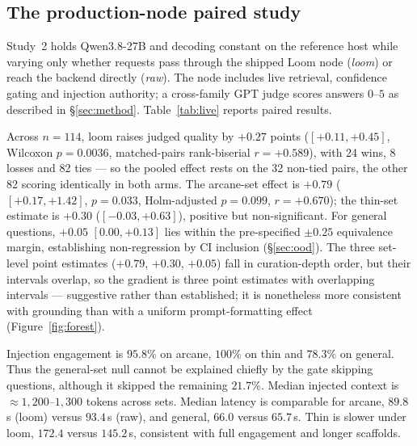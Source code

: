\documentclass[10pt,twocolumn]{article}
\begin{document}
\subsection{The production-node paired study}\label{sec:live}
Study~2 holds Qwen3.8-27B and decoding constant on the reference host while varying only whether requests pass through the shipped Loom node (\emph{loom}) or reach the backend directly (\emph{raw}). The node includes live retrieval, confidence gating and injection authority; a cross-family GPT judge scores answers $0$--$5$ as described in \S\ref{sec:method}. Table~\ref{tab:live} reports paired results.

Across $n=114$, loom raises judged quality by $\mathbf{+0.27}$ points ($[+0.11,+0.45]$, Wilcoxon $p=0.0036$, matched-pairs rank-biserial $r=+0.589$), with 24 wins, 8 losses and 82 ties --- so the pooled effect rests on the 32 non-tied pairs, the other 82 scoring identically in both arms. The arcane-set effect is $\mathbf{+0.79}$ ($[+0.17,+1.42]$, $p=0.033$, Holm-adjusted $p=0.099$, $r=+0.670$); the thin-set estimate is $+0.30$ ($[-0.03,+0.63]$), positive but non-significant. For general questions, $+0.05$ $[0.00,+0.13]$ lies within the pre-specified $\pm0.25$ equivalence margin, establishing non-regression by CI inclusion (\S\ref{sec:ood}). The three set-level point estimates ($+0.79$, $+0.30$, $+0.05$) fall in curation-depth order, but their intervals overlap, so the gradient is three point estimates with overlapping intervals --- suggestive rather than established; it is nonetheless more consistent with grounding than with a uniform prompt-formatting effect (Figure~\ref{fig:forest}).



Injection engagement is $95.8\%$ on arcane, $100\%$ on thin and $78.3\%$ on general. Thus the general-set null cannot be explained chiefly by the gate skipping questions, although it skipped the remaining $21.7\%$. Median injected context is $\approx1{,}200$--$1{,}300$ tokens across sets. Median latency is comparable for arcane, $89.8$\,s (loom) versus $93.4$\,s (raw), and general, $66.0$ versus $65.7$\,s. Thin is slower under loom, $172.4$ versus $145.2$\,s, consistent with full engagement and longer scaffolds.
\end{document}
